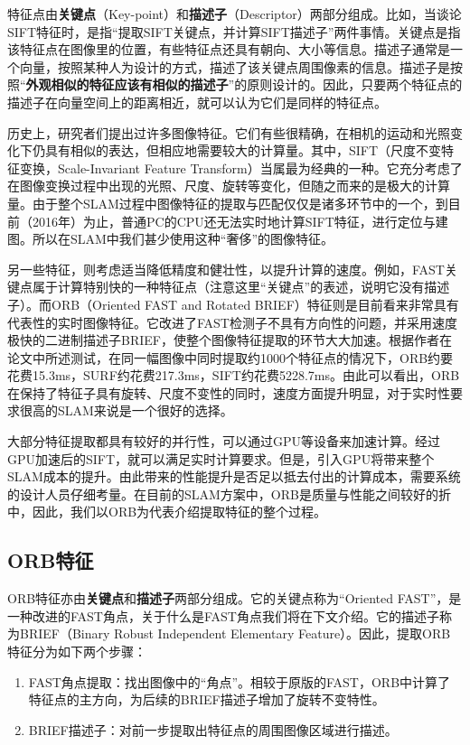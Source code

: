 特征点由\textbf{关键点}（Key-point）和\textbf{描述子}（Descriptor）两部分组成。比如，当谈论SIFT特征时，是指“提取SIFT关键点，并计算SIFT描述子”两件事情。关键点是指该特征点在图像里的位置，有些特征点还具有朝向、大小等信息。描述子通常是一个向量，按照某种人为设计的方式，描述了该关键点周围像素的信息。描述子是按照“\textbf{外观相似的特征应该有相似的描述子}”的原则设计的。因此，只要两个特征点的描述子在向量空间上的距离相近，就可以认为它们是同样的特征点。

历史上，研究者们提出过许多图像特征。它们有些很精确，在相机的运动和光照变化下仍具有相似的表达，但相应地需要较大的计算量。其中，SIFT（尺度不变特征变换，Scale-Invariant Feature Transform）当属最为经典的一种。它充分考虑了在图像变换过程中出现的光照、尺度、旋转等变化，但随之而来的是极大的计算量。由于整个SLAM过程中图像特征的提取与匹配仅仅是诸多环节中的一个，到目前（2016年）为止，普通PC的CPU还无法实时地计算SIFT特征，进行定位与建图。所以在SLAM中我们甚少使用这种“奢侈”的图像特征。

另一些特征，则考虑适当降低精度和健壮性，以提升计算的速度。例如，FAST关键点属于计算特别快的一种特征点（注意这里“关键点”的表述，说明它没有描述子）。而ORB（Oriented FAST and Rotated BRIEF）特征则是目前看来非常具有代表性的实时图像特征。它改进了FAST检测子\textsuperscript{\cite{rosten2006machine}}不具有方向性的问题，并采用速度极快的二进制描述子BRIEF\textsuperscript{\cite{calonder2010brief}}，使整个图像特征提取的环节大大加速。根据作者在论文中所述测试，在同一幅图像中同时提取约1000个特征点的情况下，ORB约要花费15.3ms，SURF约花费217.3ms，SIFT约花费5228.7ms。由此可以看出，ORB在保持了特征子具有旋转、尺度不变性的同时，速度方面提升明显，对于实时性要求很高的SLAM来说是一个很好的选择。

大部分特征提取都具有较好的并行性，可以通过GPU等设备来加速计算。经过GPU加速后的SIFT，就可以满足实时计算要求。但是，引入GPU将带来整个SLAM成本的提升。由此带来的性能提升是否足以抵去付出的计算成本，需要系统的设计人员仔细考量。在目前的SLAM方案中，ORB是质量与性能之间较好的折中，因此，我们以ORB为代表介绍提取特征的整个过程。

\subsection{ORB特征}

ORB特征亦由\textbf{关键点}和\textbf{描述子}两部分组成。它的关键点称为“Oriented FAST”，是一种改进的FAST角点，关于什么是FAST角点我们将在下文介绍。它的描述子称为BRIEF（Binary Robust Independent Elementary Feature）。因此，提取ORB特征分为如下两个步骤：
\begin{enumerate}
\item FAST角点提取：找出图像中的“角点”。相较于原版的FAST，ORB中计算了特征点的主方向，为后续的BRIEF描述子增加了旋转不变特性。
\item BRIEF描述子：对前一步提取出特征点的周围图像区域进行描述。
\end{enumerate}

